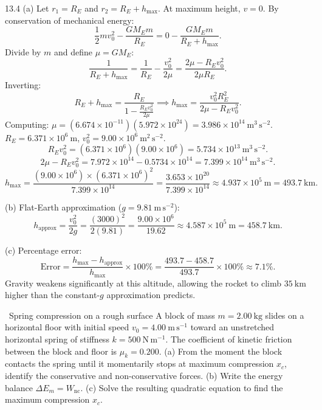 \begin{tabletworkspace}[6.0cm]
\end{tabletworkspace}

\begin{solution}{13.4}
(a) Let $r_1 = R_E$ and $r_2 = R_E + h_{\max}$. At maximum height, $v = 0$.
By conservation of mechanical energy:
\[
\frac{1}{2}m v_0^2 - \frac{GM_E m}{R_E} = 0 - \frac{GM_E m}{R_E + h_{\max}}.
\]
Divide by $m$ and define $\mu = GM_E$:
\[
\frac{1}{R_E + h_{\max}} = \frac{1}{R_E} - \frac{v_0^2}{2\mu} = \frac{2\mu - R_E v_0^2}{2\mu R_E}.
\]
Inverting:
\[
R_E + h_{\max} = \frac{R_E}{1 - \frac{R_E v_0^2}{2\mu}} \implies \boxed{h_{\max} = \frac{v_0^2 R_E^2}{2\mu - R_E v_0^2}.}
\]
Computing:
$\mu = (6.674\times 10^{-11})(5.972\times 10^{24}) = 3.986\times 10^{14}\ \mathrm{m^3\,s^{-2}}$.
$R_E = 6.371\times 10^6\ \mathrm{m}$, $v_0^2 = 9.00\times 10^6\ \mathrm{m^2\,s^{-2}}$.
\[
R_E v_0^2 = (6.371\times 10^6)(9.00\times 10^6) = 5.734\times 10^{13}\ \mathrm{m^3\,s^{-2}}.
\]
\[
2\mu - R_E v_0^2 = 7.972\times 10^{14} - 0.5734\times 10^{14} = 7.399\times 10^{14}\ \mathrm{m^3\,s^{-2}}.
\]
\[
h_{\max} = \frac{(9.00\times 10^6)\times (6.371\times 10^6)^2}{7.399\times 10^{14}} = \frac{3.653\times 10^{20}}{7.399\times 10^{14}} \approx 4.937\times 10^5\ \mathrm{m} = \mathbf{493.7\ \mathrm{km}.}
\]

(b) Flat-Earth approximation ($g = 9.81\ \mathrm{m\,s^{-2}}$):
\[
h_{\text{approx}} = \frac{v_0^2}{2g} = \frac{(3000)^2}{2(9.81)} = \frac{9.00\times 10^6}{19.62} \approx 4.587\times 10^5\ \mathrm{m} = \mathbf{458.7\ \mathrm{km}.}
\]

(c) Percentage error:
\[
\text{Error} = \frac{h_{\max} - h_{\text{approx}}}{h_{\max}}\times 100\% = \frac{493.7 - 458.7}{493.7}\times 100\% \approx \mathbf{7.1\%.}
\]
Gravity weakens significantly at this altitude, allowing the rocket to climb $35\ \mathrm{km}$ higher than the constant-$g$ approximation predicts.
\end{solution}

\begin{exercise}{\core\ Spring compression on a rough surface}
A block of mass $m=2.00\ \mathrm{kg}$ slides on a horizontal floor with initial speed $v_0 = 4.00\ \mathrm{m\,s^{-1}}$ toward an unstretched horizontal spring of stiffness $k = 500\ \mathrm{N\,m^{-1}}$. The coefficient of kinetic friction between the block and floor is $\mu_k = 0.200$.
(a) From the moment the block contacts the spring until it momentarily stops at maximum compression $x_c$, identify the conservative and non-conservative forces.
(b) Write the energy balance $\Delta E_m = W_{\text{nc}}$.
(c) Solve the resulting quadratic equation to find the maximum compression $x_c$.
\end{exercise}

